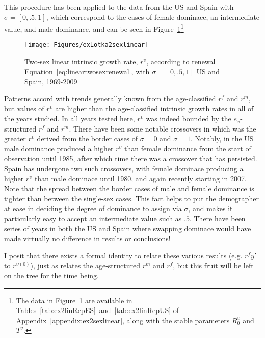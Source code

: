 This procedure has been applied to the data from the US and Spain with $\sigma
= [0,.5,1]$, which correspond to the cases of female-dominace, an
intermediate value, and male-dominance, and can be seen in
Figure~\ref{fig:rupsilonlinear2sex}\footnote{The data in
    Figure~\ref{fig:rupsilonlinear2sex} are available in
    Tables~\ref{tab:ex2linRepES}~and~\ref{tab:ex2linRepUS} of
    Appendix~\ref{appendix:ex2sexlinear}, along with the stable parameters
    $R_0^\upsilon$ and $T^\upsilon$.}

\begin{figure}[!ht]
  \centering
    \caption{Two-sex linear intrinsic growth rate, $r^\upsilon$, according to
    renewal Equation~\eqref{eq:lineartwosexrenewal}, with $\sigma = [0, .5, 1]$ US 
    and Spain, 1969-2009}
     \texttt{[image: Figures/exLotka2sexlinear]}
     \label{fig:rupsilonlinear2sex}
\end{figure}

Patterns accord with trends generally known from the age-classified $r^f$ and
$r^m$, but values of $r^\upsilon$ are higher than the
age-classified intrinsic growth rates in all of the years studied. In all years
tested here, $r^\upsilon$ was indeed bounded by the $e_x$-structured $r^f$ and $r^m$. There have been some notable crossovers in
which was the greater $r^\upsilon$ derived from the border cases of $\sigma = 0$
and  $\sigma = 1$. Notably, in the US male dominance produced a higher
$r^\upsilon$ than female dominance from the start of observation until
1985, after which time there was a crossover that has persisted. Spain has
undergone two such crossovers, with female dominace producing a higher
$r^\upsilon$ than male dominace until 1980, and again recently starting in 2007.
Note that the spread between the border cases of male and female dominance is
tighter than between the single-sex cases. This fact helps to put the
demographer at ease in deciding the degree of dominance to assign via $\sigma$,
and makes it particularly easy to accept an intermediate value such as $.5$.
There have been series of years in both the US and Spain where swapping dominace
would have made virtually no difference in results or conclusions!

I posit that there exists a formal identity to relate these various results
(e.g. $r^f{y'}$ to $r^{\upsilon (0)}$), just as \citet[pp. 56]{coale1972growth} relates 
the age-structured $r^m$ and $r^f$, but this fruit will be left on the tree
for the time being.

